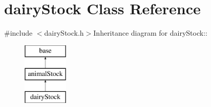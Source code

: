 \hypertarget{classdairy_stock}{
\section{dairyStock Class Reference}
\label{classdairy_stock}
}


{\ttfamily \#include $<$dairyStock.h$>$}Inheritance diagram for dairyStock::\begin{figure}[H]
\begin{center}
\leavevmode
\includegraphics[height=3cm]{classdairy_stock}
\end{center}
\end{figure}

